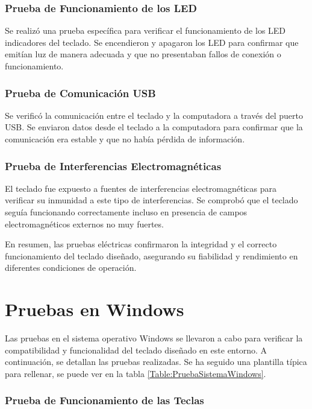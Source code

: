 \subsubsection{Prueba de Funcionamiento de los \gls{LED}}

Se realizó una prueba específica para verificar el funcionamiento de los \gls{LED} indicadores del teclado. Se encendieron y apagaron los \gls{LED} para confirmar que emitían luz de manera adecuada y que no presentaban fallos de conexión o funcionamiento.

\subsubsection{Prueba de Comunicación \gls{USB}}

Se verificó la comunicación entre el teclado y la computadora a través del puerto \gls{USB}. Se enviaron datos desde el teclado a la computadora para confirmar que la comunicación era estable y que no había pérdida de información.

\subsubsection{Prueba de Interferencias Electromagnéticas}

El teclado fue expuesto a fuentes de interferencias electromagnéticas para verificar su inmunidad a este tipo de interferencias. Se comprobó que el teclado seguía funcionando correctamente incluso en presencia de campos electromagnéticos externos no muy fuertes.

En resumen, las pruebas eléctricas confirmaron la integridad y el correcto funcionamiento del teclado diseñado, asegurando su fiabilidad y rendimiento en diferentes condiciones de operación.

\section{Pruebas en \gls{Windows}}

Las pruebas en el sistema operativo \gls{Windows} se llevaron a cabo para verificar la compatibilidad y funcionalidad del teclado diseñado en este entorno. A continuación, se detallan las pruebas realizadas. Se ha seguido una plantilla típica para rellenar, se puede ver en la tabla \ref{Table:PruebaSistemaWindows}.

\subsubsection{Prueba de Funcionamiento de las Teclas}

